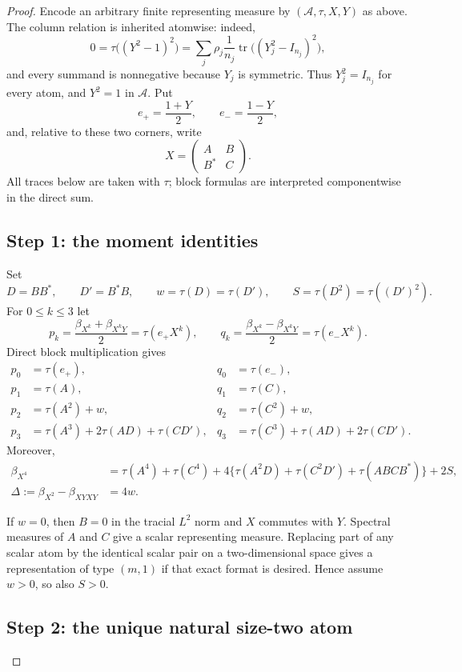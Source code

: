 \documentclass[11pt]{article}
\newcommand{\tr}{\operatorname{tr}}
\begin{document}
\begin{proof}
Encode an arbitrary finite representing measure by $(\mathcal A,\tau,X,Y)$
as above.  The column relation is inherited atomwise: indeed,
\[
 0=\tau\bigl((Y^2-1)^2\bigr)
   =\sum_j\rho_j\frac1{n_j}\tr\bigl((Y_j^2-I_{n_j})^2\bigr),
\]
and every summand is nonnegative because $Y_j$ is symmetric.  Thus
$Y_j^2=I_{n_j}$ for every atom, and $Y^2=1$ in $\mathcal A$.  Put
\[
 e_+=\frac{1+Y}{2},\qquad e_-=\frac{1-Y}{2},
\]
and, relative to these two corners, write
\[
 X=\begin{pmatrix}A&B\\B^*&C\end{pmatrix}.
\]
All traces below are taken with $\tau$; block formulas are interpreted
componentwise in the direct sum.

\subsection*{Step 1: the moment identities}

Set
\[
 D=BB^*,\qquad D'=B^*B,\qquad
 w=\tau(D)=\tau(D'),\qquad
 S=\tau(D^2)=\tau((D')^2).
\]
For $0\leq k\leq3$ let
\[
 p_k=\frac{\beta_{X^k}+\beta_{X^kY}}2=\tau(e_+X^k),\qquad
 q_k=\frac{\beta_{X^k}-\beta_{X^kY}}2=\tau(e_-X^k).
\]
Direct block multiplication gives
\begin{align*}
 p_0&=\tau(e_+),&q_0&=\tau(e_-),\\
 p_1&=\tau(A),&q_1&=\tau(C),\\
 p_2&=\tau(A^2)+w,&q_2&=\tau(C^2)+w,\\
 p_3&=\tau(A^3)+2\tau(AD)+\tau(CD'),
 &q_3&=\tau(C^3)+\tau(AD)+2\tau(CD').
\end{align*}
Moreover,
\begin{align}
 \beta_{X^4}
 &=\tau(A^4)+\tau(C^4)
   +4\{\tau(A^2D)+\tau(C^2D')+\tau(ABCB^*)\}+2S,\label{eq:x4}\\
 \Delta:=\beta_{X^2}-\beta_{XYXY}&=4w.\label{eq:delta}
\end{align}

If $w=0$, then $B=0$ in the tracial $L^2$ norm and $X$ commutes with $Y$.
Spectral measures of $A$ and $C$ give a scalar representing measure.
Replacing part of any scalar atom by the identical scalar pair on a
two-dimensional space gives a representation of type $(m,1)$ if that exact
format is desired.  Hence assume $w>0$, so also $S>0$.

\subsection*{Step 2: the unique natural size-two atom}


\end{proof}
\end{document}
